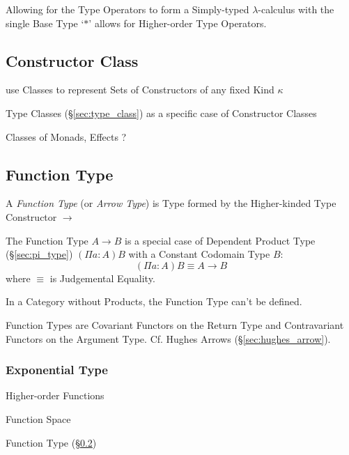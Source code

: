 Allowing for the Type Operators to form a Simply-typed
$\lambda$-calculus with the single Base Type `$*$' allows for
Higher-order Type Operators.



\subsection{Constructor Class}\label{sec:constructor_class}

use Classes to represent Sets of Constructors of any fixed Kind
$\kappa$

Type Classes (\S\ref{sec:type_class}) as a specific case of
Constructor Classes

Classes of Monads, Effects ?



\subsection{Function Type}\label{sec:function_type}

A \emph{Function Type} (or \emph{Arrow Type}) is Type formed by the
Higher-kinded Type Constructor $\rightarrow$

The Function Type $A \rightarrow B$ is a special case of Dependent
Product Type (\S\ref{sec:pi_type}) $(\Pi a:A)B$ with a Constant
Codomain Type $B$:
\[
  (\Pi a:A)B \equiv A \rightarrow B
\]
where $\equiv$ is Judgemental Equality.

In a Category without Products, the Function Type can't be defined.

Function Types are Covariant Functors on the Return Type and
Contravariant Functors on the Argument Type. Cf. Hughes Arrows
(\S\ref{sec:hughes_arrow}).



\subsubsection{Exponential Type}\label{sec:exponential_type}

Higher-order Functions

Function Space

Function Type (\S\ref{sec:function_type})



